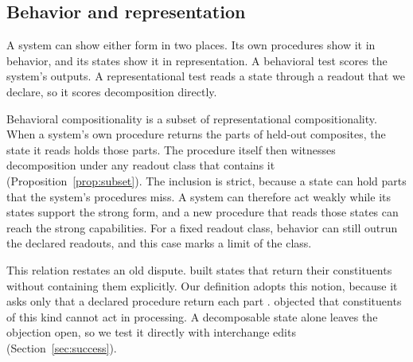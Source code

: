 \subsection{Behavior and representation}
\label{sec:subset}

A system can show either form in two places. Its own procedures show it in behavior, and its states show it in representation. A behavioral test scores the system's outputs. A representational test reads a state through a readout that we declare, so it scores decomposition directly.

Behavioral compositionality is a subset of representational compositionality. When a system's own procedure returns the parts of held-out composites, the state it reads holds those parts. The procedure itself then witnesses decomposition under any readout class that contains it (Proposition~\ref{prop:subset}). The inclusion is strict, because a state can hold parts that the system's procedures miss. A system can therefore act weakly while its states support the strong form, and a new procedure that reads those states can reach the strong capabilities. For a fixed readout class, behavior can still outrun the declared readouts, and this case marks a limit of the class.

This relation restates an old dispute. \citet{smolensky1990} built states that return their constituents without containing them explicitly. Our definition adopts this notion, because it asks only that a declared procedure return each part \citep[cf.][]{vangelder1990}. \citet{fodor1990} objected that constituents of this kind cannot act in processing. A decomposable state alone leaves the objection open, so we test it directly with interchange edits (Section~\ref{sec:success}).

